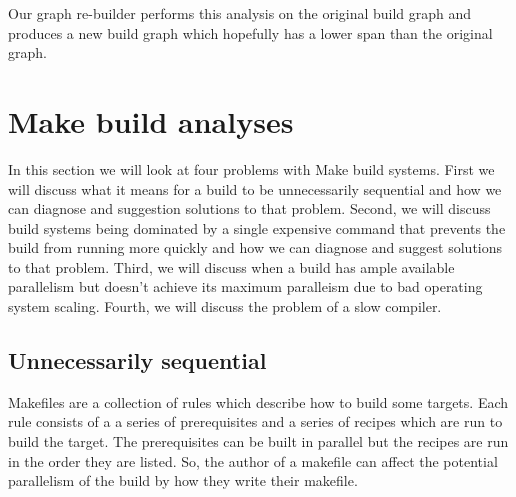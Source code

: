 \documentclass[twocolumn,sigplan,10pt,review]{acmart}
\begin{document}
Our graph re-builder performs this analysis on the original build graph and produces a new build
graph which hopefully has a lower span than the original graph.





\section{Make build analyses}

In this section we will look at four problems with Make build systems.  First we will discuss
what it means for a build to be unnecessarily sequential and how we can diagnose and suggestion
solutions to that problem.  Second, we will discuss build systems being dominated by a single
expensive command that prevents the build from running more quickly and how we can diagnose and
suggest solutions to that problem.  Third, we will discuss when a build has ample available
parallelism but doesn't achieve its maximum paralleism due to bad operating system scaling.
Fourth, we will discuss the problem of a slow compiler.

\subsection{Unnecessarily sequential}

Makefiles are a collection of rules which describe how to build some targets.  Each rule consists
of a a series of prerequisites and a series of recipes which are run to build the target.  The
prerequisites can be built in parallel but the recipes are run in the order they are listed.  So,
the author of a makefile can affect the potential parallelism of the build by how they write their
makefile.
\end{document}
